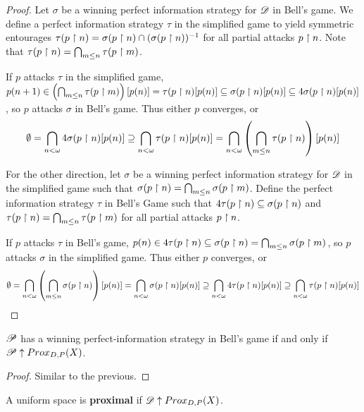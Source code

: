\begin{proof}
  Let $\sigma$ be a winning perfect information strategy for $\mathscr{D}$ in Bell's game. We define a perfect information strategy $\tau$ in the simplified game to yield symmetric entourages $\tau(p\restriction n)=\sigma(p\restriction n)\cap(\sigma(p\restriction n))^{-1}$ for all partial attacks $p\restriction n$. Note that $\tau(p\restriction n)=\bigcap_{m\leq n}\tau(p\restriction m)$.

  If $p$ attacks $\tau$ in the simplified game, $p(n+1)\in\left(\bigcap_{m\leq n}\tau(p\restriction m)\right)[p(n)]=\tau(p\restriction n)[p(n)]\subseteq\sigma(p\restriction n)[p(n)]\subseteq 4\sigma(p\restriction n)[p(n)]$, so $p$ attacks $\sigma$ in Bell's game. Thus either $p$ converges, or 
    \[
      \emptyset
        =
      \bigcap_{n<\omega} 4\sigma(p\restriction n)[p(n)]
        \supseteq 
      \bigcap_{n<\omega}\tau(p\restriction n)[p(n)]
        =
      \bigcap_{n<\omega}\left(\bigcap_{m\leq n}\tau(p\restriction n)\right)[p(n)]
    \]

  For the other direction, let $\sigma$ be a winning perfect information strategy for $\mathscr{D}$ in the simplified game such that $\sigma(p\restriction n)=\bigcap_{m\leq n}\sigma(p\restriction m)$. Define the perfect information strategy $\tau$ in Bell's Game such that $4\tau(p\restriction n)\subseteq \sigma(p\restriction n)$ and $\tau(p\restriction n)=\bigcap_{m\leq n}\tau(p\restriction m)$ for all partial attacks $p\restriction n$.

  If $p$ attacks $\tau$ in Bell's game, $p(n)\in 4\tau(p\restriction n)\subseteq\sigma(p\restriction n)=\bigcap_{m\leq n}\sigma(p\restriction m)$, so $p$ attacks $\sigma$ in the simplified game. Thus either $p$ converges, or
    \[
      \emptyset
        =
      \bigcap_{n<\omega}\left(\bigcap_{m\leq n}\sigma(p\restriction n)\right)[p(n)]
        =
      \bigcap_{n<\omega}\sigma(p\restriction n)[p(n)]
        \supseteq
      \bigcap_{n<\omega}4\tau(p\restriction n)[p(n)]
        \supseteq
      \bigcap_{n<\omega}\tau(p\restriction n)[p(n)]
    \]
\end{proof}

\begin{proposition}
$\mathscr{P}$ has a winning perfect-information strategy in Bell's game if and only if $\mathscr{P} \uparrow Prox_{D,P}(X)$.
\end{proposition}

\begin{proof}
  Similar to the previous.
\end{proof}

\begin{definition}
  A uniform space is \textbf{proximal} if $\mathscr{D} \uparrow Prox_{D,P}(X)$.
\end{definition}

